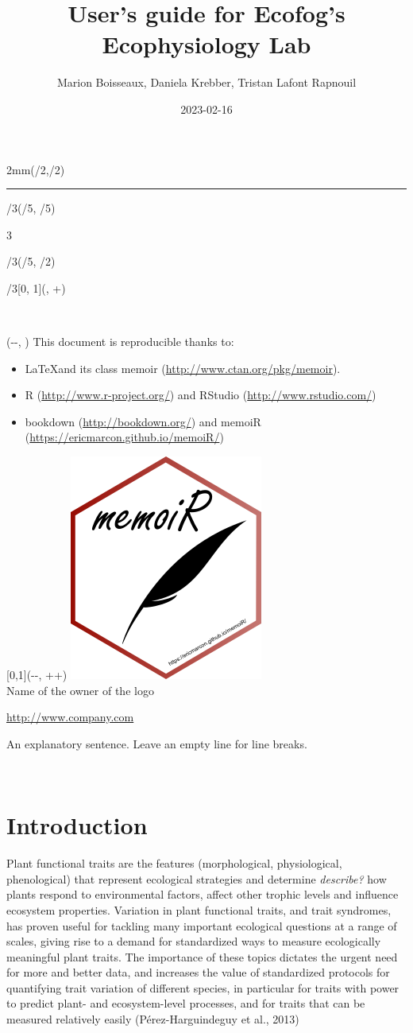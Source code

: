 \documentclass[
  12pt,
  american,
  a4paper,
  extrafontsizes,onecolumn,openright
  ]{memoir}
\title{User's guide for Ecofog's Ecophysiology Lab}
\author{Marion Boisseaux, Daniela Krebber, Tristan Lafont Rapnouil}
\date{2023-02-16}
\makeatletter
\newcommand{\MemoirChapStyle}{daleif1}
\newcommand{\MemoirPageStyle}{Ruled}
\newlength\widthw %
\newcommand*{\SmallMargins}{
  \setlrmarginsandblock{1.5in}{1.5in}{*}
  \setmarginnotes{0.1in}{0.1in}{0.1in}
 \setulmarginsandblock{1.5in}{1in}{*}
  \checkandfixthelayout
  \ch@ngetext
  \clearpage
  \setlength{\widthw}{\textwidth+\marginparsep+\marginparwidth}
  \footnotesatfoot
  \chapterstyle{\MemoirChapStyle}  %
  \pagestyle{\MemoirPageStyle}
}
\newcommand{\LargeMargins}{\SmallMargins}
\newcommand{\MainTitlePage}[2]{
  \SmallMargins %
  \pagestyle{empty} %
  \textblockorigin{\stockwidth-\paperwidth-\trimedge}{\trimtop} %
  \begin{textblock*}{2mm}(\spinemargin/2,\uppermargin/2)
    \rule{1pt}{\paperheight-\uppermargin}
  \end{textblock*}
  \begin{textblock*}{\paperwidth*2/3}(\paperwidth/5, \paperheight/5)
    \flushright
    \begin{Spacing}{3}
      {\fontfamily{qtm}\selectfont\fontsize{45}{45}\selectfont\textsc{\thetitle}}
    \end{Spacing}
  \end{textblock*}
    \begin{textblock*}{\paperwidth*2/3}(\paperwidth/5, \paperheight/2)
    \flushright
    {\fontfamily{qtm}\huge\theauthor}
  \end{textblock*}
    \begin{textblock*}{\paperwidth*2/3}[0, 1](\spinemargin, \uppermargin+\textheight)
    \normalfont\thedate
  \end{textblock*}
  ~\\ %
  \newpage
  \textblockorigin{\trimedge}{\trimtop} %
  \begin{textblock*}{\textwidth}(\paperwidth-\spinemargin-\textwidth, \uppermargin)
    #1
  \end{textblock*}
  \begin{textblock*}{\textwidth}[0,1](\paperwidth-\spinemargin-\textwidth, \uppermargin+\textheight+\footskip)
    \centering
    \includegraphics[width=\paperwidth/4]{logo}\\ \bigskip
    #2
  \end{textblock*}
  ~\\ %
  \newpage
}
\makeatother
\begin{document}
\frontmatter



\cleardoublepage

\MainTitlePage{This document is reproducible thanks to:

\begin{itemize}
  \item \LaTeX and its class memoir (\url{http://www.ctan.org/pkg/memoir}).
  \item R (\url{http://www.r-project.org/}) and RStudio (\url{http://www.rstudio.com/})
  \item bookdown (\url{http://bookdown.org/}) and memoiR (\url{https://ericmarcon.github.io/memoiR/})
\end{itemize}}{Name of the owner of the logo

\url{http://www.company.com}

An explanatory sentence.
Leave an empty line for line breaks.}







\LargeMargins
{
\hypersetup{linkcolor=}
\setcounter{tocdepth}{2}
\tableofcontents
}



\LargeMargins
\hypertarget{intro}{%
\chapter{Introduction}\label{intro}}

Plant functional traits are the features (morphological, physiological, phenological) that represent ecological strategies and determine \emph{describe?} how plants respond to environmental factors, affect other trophic levels and influence ecosystem properties.
Variation in plant functional traits, and trait syndromes, has proven useful for tackling many important ecological questions at a range of scales, giving rise to a demand for standardized ways to measure ecologically meaningful plant traits.
The importance of these topics dictates the urgent need for more and better data, and increases the value of standardized protocols for quantifying trait variation of different species, in particular for traits with power to predict plant- and ecosystem-level processes, and for traits that can be measured relatively easily (Pérez-Harguindeguy et al., 2013)
\end{document}
